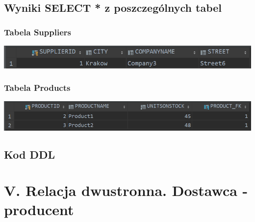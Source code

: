 \documentclass[a4paper, 11pt]{article}
\begin{document}
    \newpage

    \subsection{Wyniki SELECT * z poszczególnych tabel}
    \subsubsection{Tabela Suppliers}
    \begin{center}
        \includegraphics{images/point4_without_additional_table/SelectSuppliers.png}
    \end{center}

    \subsubsection{Tabela Products}
    \begin{center}
        \includegraphics[scale=0.9]{images/point4_without_additional_table/SelectProducts.png}
    \end{center}

    \newpage

    \subsection{Kod DDL}
    

    \newpage



    \section{V. Relacja dwustronna. Dostawca - producent}
\end{document}
